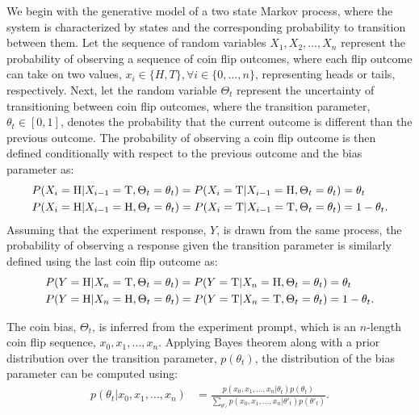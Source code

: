 \documentclass[11pt]{article}
\begin{document}
We begin with the generative model of a two state Markov process, where the system is characterized by states and the corresponding probability to transition between them. Let the sequence of random variables $X_1, X_2, \dots, X_n$ represent the probability of observing a sequence of coin flip outcomes, where each flip outcome can take on two values, $x_i \in \{H,T\}, \forall i \in \{0, \dots, n\}$, representing heads or tails, respectively. Next, let the random variable $\Theta_t$ represent the uncertainty of transitioning between coin flip outcomes, where the transition parameter, $\theta_t \in [0,1]$, denotes the probability that the current outcome is different than the previous outcome. The probability of observing a coin flip outcome is then defined conditionally with respect to the previous outcome and the bias parameter as:
\begin{align}
    P(X_i = \textrm{H} | X_{i-1} = \textrm{T}, \Theta_t = \theta_t) = P(X_i = \textrm{T} | X_{i-1} = \textrm{H}, \Theta_t = \theta_t) &= \theta_t \notag \\ 
    P(X_i = \textrm{H} | X_{i-1} = \textrm{H}, \Theta_t = \theta_t) = P(X_i = \textrm{T} | X_{i-1} = \textrm{T}, \Theta_t = \theta_t) &= 1 - \theta_t \label{eq:tcoin_x}.
\end{align}
Assuming that the experiment response, $Y$, is drawn from the same process, the probability of observing a response given the transition parameter is similarly defined using the last coin flip outcome as: 
\begin{align}
    P(Y = \textrm{H} | X_n = \textrm{T}, \Theta_t = \theta_t) = P(Y = \textrm{T}| X_n = \textrm{H}, \Theta_t = \theta_t) &= \theta_t \notag \\ 
    P(Y = \textrm{H} | X_n = \textrm{H}, \Theta_t = \theta_t) = P(Y = \textrm{T} | X_n = \textrm{T}, \Theta_t = \theta_t) &= 1 - \theta_t \label{eq:tcoin_y}.
\end{align}

The coin bias, $\Theta_t$, is inferred from the experiment prompt, which is an $n$-length coin flip sequence, $x_0, x_1, \dots, x_n$. Applying Bayes theorem along with a prior distribution over the transition parameter, $p(\theta_t)$, the distribution of the bias parameter can be computed using:
\begin{align}
    p(\theta_t | x_0, x_1, \dots, x_n) &= \frac{p(x_0, x_1, \dots, x_n | \theta_t)p(\theta_t)} {\sum\limits_{\theta'_t} p(x_0, x_1, \dots, x_n | \theta'_t)p(\theta'_t)} \label{eq:tcoin_bayes}.
\end{align}
\end{document}
